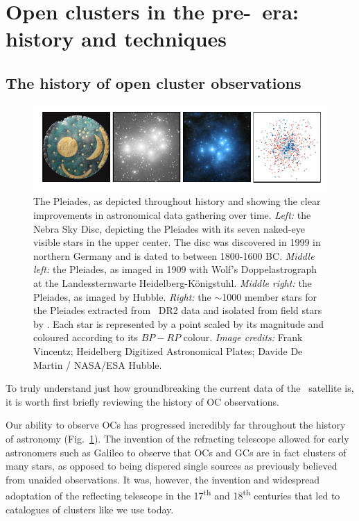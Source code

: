 \section{Open clusters in the pre-\gaia\ era: history and techniques}
\label{sec:intro:history}

\subsection{The history of open cluster observations}
\label{sec:intro:history:history}

\begin{figure}[tb]
	\includegraphics[width=\textwidth]{fig/c1/pleiades.pdf}
	\caption[The Pleiades as depicted throughout history.]{The Pleiades, as depicted throughout history and showing the clear improvements in astronomical data gathering over time. \emph{Left:} the Nebra Sky Disc, depicting the Pleiades with its seven naked-eye visible stars in the upper center. The disc was discovered in 1999 in northern Germany and is dated to between 1800-1600 BC. \emph{Middle left:} the Pleiades, as imaged in 1909 with Wolf's Doppelastrograph at the Landessternwarte Heidelberg-Königstuhl. \emph{Middle right:} the Pleiades, as imaged by Hubble. \emph{Right:} the $\sim$1000 member stars for the Pleiades extracted from \gaia\ DR2 data and isolated from field stars by \cite{cantat-gaudin_characterising_2018}. Each star is represented by a point scaled by its magnitude and coloured according to its $BP-RP$ colour. \emph{Image credits:} Frank Vincentz; Heidelberg Digitized Astronomical Plates; Davide De Martin / NASA/ESA Hubble.}
	\label{fig:intro:history:pleiades}
\end{figure}

To truly understand just how groundbreaking the current data of the \gaia\ satellite is, it is worth first briefly reviewing the history of OC observations.

Our ability to observe OCs has progressed incredibly far throughout the history of astronomy (Fig.~\ref{fig:intro:history:pleiades}). The invention of the refracting telescope allowed for early astronomers such as Galileo to observe that OCs and GCs are in fact clusters of many stars, as opposed to being dispered single sources as previously believed from unaided observations. It was, however, the invention and widespread adoptation of the reflecting telescope in the 17\textsuperscript{th} and 18\textsuperscript{th} centuries that led to catalogues of clusters like we use today.

